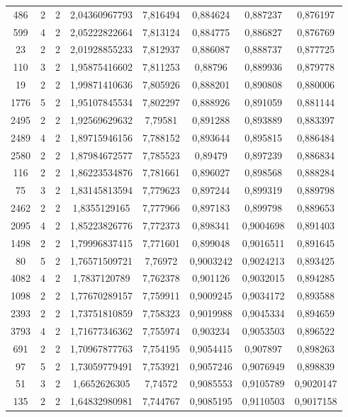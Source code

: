 \begin{longtable}{|c|c|c|c|c|c|c|c|}
486 & 2 & 2 & 2,04360967793 & 7,816494 & 0,884624 & 0,887237 & 0,876197 \\
599 & 4 & 2 & 2,05222822664 & 7,813124 & 0,884775 & 0,886827 & 0,876769 \\
23 & 2 & 2 & 2,01928855233 & 7,812937 & 0,886087 & 0,888737 & 0,877725 \\
110 & 3 & 2 & 1,95875416602 & 7,811253 & 0,88796 & 0,889936 & 0,879778 \\
19 & 2 & 2 & 1,99871410636 & 7,805926 & 0,888201 & 0,890808 & 0,880006 \\
1776 & 5 & 2 & 1,95107845534 & 7,802297 & 0,888926 & 0,891059 & 0,881144 \\
2495 & 2 & 2 & 1,92569629632 & 7,79581 & 0,891288 & 0,893889 & 0,883397 \\
2489 & 4 & 2 & 1,89715946156 & 7,788152 & 0,893644 & 0,895815 & 0,886484 \\
2580 & 2 & 2 & 1,87984672577 & 7,785523 & 0,89479 & 0,897239 & 0,886834 \\
116 & 2 & 2 & 1,86223534876 & 7,781661 & 0,896027 & 0,898568 & 0,888284 \\
75 & 3 & 2 & 1,83145813594 & 7,779623 & 0,897244 & 0,899319 & 0,889798 \\
2462 & 2 & 2 & 1,8355129165 & 7,777966 & 0,897183 & 0,899798 & 0,889653 \\
2095 & 4 & 2 & 1,85223826776 & 7,772373 & 0,898341 & 0,9004698 & 0,891403 \\
1498 & 2 & 2 & 1,79996837415 & 7,771601 & 0,899048 & 0,9016511 & 0,891645 \\
80 & 5 & 2 & 1,76571509721 & 7,76972 & 0,9003242 & 0,9024213 & 0,893425 \\
4082 & 4 & 2 & 1,7837120789 & 7,762378 & 0,901126 & 0,9032015 & 0,894285 \\
1098 & 2 & 2 & 1,77670289157 & 7,759911 & 0,9009245 & 0,9034172 & 0,893588 \\
2393 & 2 & 2 & 1,73751810859 & 7,758323 & 0,9019988 & 0,9045334 & 0,894659 \\
3793 & 4 & 2 & 1,71677346362 & 7,755974 & 0,903234 & 0,9053503 & 0,896522 \\
691 & 2 & 2 & 1,70967877763 & 7,754195 & 0,9054415 & 0,907897 & 0,898263 \\
97 & 5 & 2 & 1,73059779491 & 7,753921 & 0,9057246 & 0,9076949 & 0,898839 \\
51 & 3 & 2 & 1,6652626305 & 7,74572 & 0,9085553 & 0,9105789 & 0,9020147 \\
135 & 2 & 2 & 1,64832980981 & 7,744767 & 0,9085195 & 0,9110503 & 0,9017158 \\

\end{longtable}

